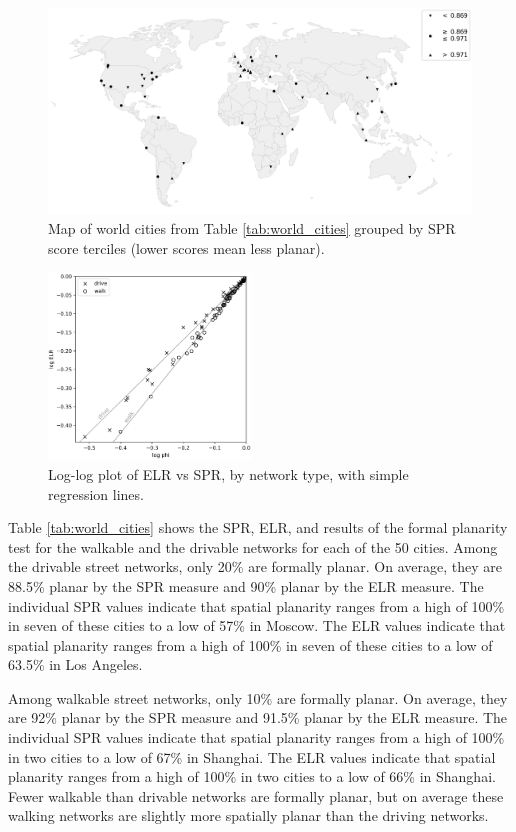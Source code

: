 \documentclass[Afour,sageh,times]{sagej}
\begin{document}
\begin{figure}[htbp]
	\center
	\includegraphics[width=\textwidth]{world_map_phi_bw.png}
	\caption{Map of world cities from Table \ref{tab:world_cities} grouped by SPR score terciles (lower scores mean less planar).}
	\label{fig:world_map_bw}
\end{figure}

\begin{figure}[htbp]
	\includegraphics[width=0.48\textwidth]{regression_phi_split.png}
	\caption{Log-log plot of ELR vs SPR, by network type, with simple regression lines.}
	\label{fig:regression_split}
\end{figure}

Table \ref{tab:world_cities} shows the SPR, ELR, and results of the formal planarity test for the walkable and the drivable networks for each of the 50 cities. Among the drivable street networks, only 20\% are formally planar. On average, they are 88.5\% planar by the SPR measure and 90\% planar by the ELR measure. The individual SPR values indicate that spatial planarity ranges from a high of 100\% in seven of these cities to a low of 57\% in Moscow. The ELR values indicate that spatial planarity ranges from a high of 100\% in seven of these cities to a low of 63.5\% in Los Angeles.

Among walkable street networks, only 10\% are formally planar. On average, they are 92\% planar by the SPR measure and 91.5\% planar by the ELR measure. The individual SPR values indicate that spatial planarity ranges from a high of 100\% in two cities to a low of 67\% in Shanghai. The ELR values indicate that spatial planarity ranges from a high of 100\% in two cities to a low of 66\% in Shanghai. Fewer walkable than drivable networks are formally planar, but on average these walking networks are slightly more spatially planar than the driving networks.
\end{document}
